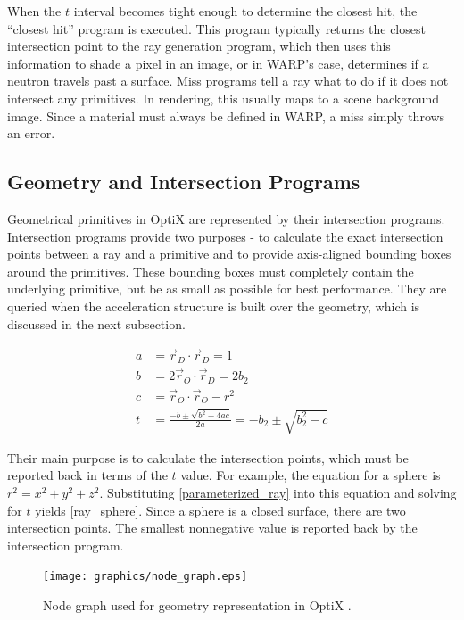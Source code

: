 When the $t$ interval becomes tight enough to determine the closest hit, the ``closest hit'' program is executed.  This program typically returns the closest intersection point to the ray generation program, which then uses this information to shade a pixel in an image, or in WARP's case, determines if a neutron travels past a surface.  Miss programs tell a ray what to do if it does not intersect any primitives.  In rendering, this usually maps to a scene background image.  Since a material must always be defined in WARP, a miss simply throws an error.

\subsection{Geometry and Intersection Programs}

Geometrical primitives in OptiX are represented by their intersection programs.  Intersection programs provide two purposes - to calculate the exact intersection points between a ray and a primitive and to provide axis-aligned bounding boxes around the primitives.  These bounding boxes must completely contain the underlying primitive, but be as small as possible for best performance.  They are queried when the acceleration structure is built over the geometry, which is discussed in the next subsection.  

\begin{equation}
\label{ray_sphere}
\begin{split}
a &= \vec{r}_D \cdot \vec{r}_D = 1\\
b &= 2 \vec{r}_O \cdot \vec{r}_D = 2b_2\\
c &= \vec{r}_O \cdot \vec{r}_O - r^2 \\
t &= \frac{-b \pm \sqrt{b^2-4ac}}{2a} = -b_2 \pm \sqrt{b_2^2-c}
\end{split}
\end{equation}

Their main purpose is to calculate the intersection points, which must be reported back in terms of the $t$ value.  For example, the equation for a sphere is $r^2=x^2+y^2+z^2$.  Substituting \eqref{parameterized_ray} into this equation and solving for $t$ yields \eqref{ray_sphere}.  Since a sphere is a closed surface, there are two intersection points.  The smallest nonnegative value is reported back by the intersection program.

 \begin{figure}[h!] 
  \centering
    \texttt{[image: graphics/node\_graph.eps]}
     \caption{Node graph used for geometry representation in OptiX \cite{optix}. \label{node_graph}}
\end{figure}

